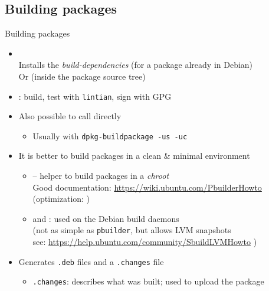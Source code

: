 \documentclass[10pt,final]{beamer}
\begin{document}
\subsection{Building packages}
\begin{frame}{Building packages}
  \begin{itemize}
  \item {}\\
    Installs the \textsl{build-dependencies} (for a package already in Debian)\\
    Or  (inside the package source tree)
    
    \br
  \item {}: build, test with \texttt{lintian}, sign with GPG
    \br
  \item Also possible to call  directly
    \begin{itemize}
    \item Usually with \texttt{dpkg-buildpackage -us -uc}
    \end{itemize}
    \br
  \item It is better to build packages in a clean \& minimal environment
    \begin{itemize}
    \item {} -- helper to build packages in a \textsl{chroot}\\
      Good documentation: \url{https://wiki.ubuntu.com/PbuilderHowto}\\
      (optimization:   )
      \hbr
    \item {} and : used on the Debian build daemons\\
      (not as simple as \texttt{pbuilder}, but allows LVM snapshots\\
       see: \url{https://help.ubuntu.com/community/SbuildLVMHowto} )
    \end{itemize}
    \br
  \item Generates \texttt{.deb} files and a \texttt{.changes} file
    \begin{itemize}
    \item \texttt{.changes}: describes what was built; used to upload the package
    \end{itemize}
  \end{itemize}
\end{frame}
\end{document}
